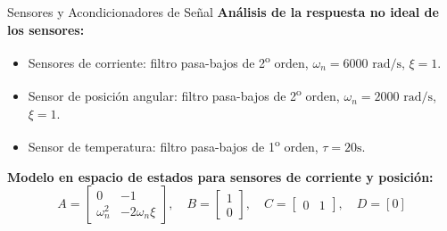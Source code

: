 \documentclass[12pt]{beamer}
\begin{document}
\begin{frame}{Sensores y Acondicionadores de Señal}
    \textbf{Análisis de la respuesta no ideal de los sensores:}
    \begin{itemize}
        \item Sensores de corriente: filtro pasa-bajos de 2\textsuperscript{o} orden, \(\omega_n = 6000 \text{ rad/s}\), \(\xi = 1\).
        \item Sensor de posición angular: filtro pasa-bajos de 2\textsuperscript{o} orden, \(\omega_n = 2000 \text{ rad/s}\), \(\xi = 1\).
        \item Sensor de temperatura: filtro pasa-bajos de 1\textsuperscript{o} orden, \(\tau = 20 \text{s}\).
    \end{itemize}

    \textbf{Modelo en espacio de estados para sensores de corriente y posición:}
    \[
        A = \begin{bmatrix} 0 & -1 \\ \omega_n^2 & -2 \omega_n \xi \end{bmatrix}, \quad 
        B = \begin{bmatrix} 1 \\ 0 \end{bmatrix}, \quad 
        C = \begin{bmatrix} 0 & 1 \end{bmatrix}, \quad D = [0]
    \]
\end{frame}
\end{document}
